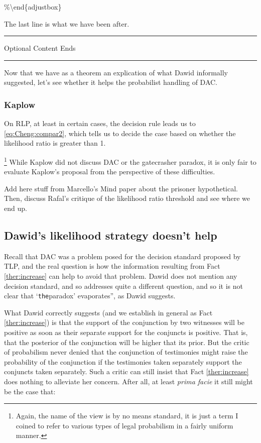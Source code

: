 \documentclass[10pt,dvipsnames,enabledeprecatedfontcommands]{scrartcl}
\newcommand{\intermezzob}{\nopagebreak 
	\begin{minipage}[c]{13cm}
	\begin{center}\rule{10cm}{0.4pt}

	\tiny{\sc Optional Content Ends}
	
	\vspace{-1mm}
	
	\rule{10cm}{0.4pt}\end{center}
	\end{minipage}
	}
\begin{document}
\%\textbackslash{}end\{adjustbox\}

\vspace{1mm}

The last line is what we have been after.

\intermezzob

Now that we have as a theorem an explication of what Dawid informally
suggested, let's see whether it helps the probabilist handling of DAC.

\hypertarget{kaplow-1}{%
\subsubsection{Kaplow}\label{kaplow-1}}

On RLP, at least in certain cases, the decision rule leads us to
\eqref{eq:Cheng:compar2}, which tells us to decide the case based on
whether the likelihood ratio is greater than 1.

\footnote{Again, the name of the view is by no means standard, it is  just a term I coined to refer to various types of legal probabilism in a fairly uniform manner.}
While Kaplow did not discuss DAC or the gatecrasher paradox, it is only
fair to evaluate Kaplow's proposal from the perspective of these
difficulties.

Add here stuff from Marcello's Mind paper about the prisoner
hypothetical. Then, discuss Rafal's critique of the likelihood ratio
threshold and see where we end up.

\hypertarget{dawids-likelihood-strategy-doesnt-help}{%
\subsection{Dawid's likelihood strategy doesn't
help}\label{dawids-likelihood-strategy-doesnt-help}}

Recall that DAC was a problem posed for the decision standard proposed
by TLP, and the real question is how the information resulting from Fact
\ref{ther:increase} can help to avoid that problem. Dawid does not
mention any decision standard, and so addresses quite a different
question, and so it is not clear that `\texttt{the}paradox'
evaporates'', as Dawid suggests.

What Dawid correctly suggests (and we establish in general as Fact
\ref{ther:increase}) is that the support of the conjunction by two
witnesses will be positive as soon as their separate support for the
conjuncts is positive. That is, that the posterior of the conjunction
will be higher that its prior. But the critic of probabilism never
denied that the conjunction of testimonies might raise the probability
of the conjunction if the testimonies taken separately support the
conjuncts taken separately. Such a critic can still insist that Fact
\ref{ther:increase} does nothing to alleviate her concern. After all, at
least \emph{prima facie} it still might be the case that:
\end{document}
